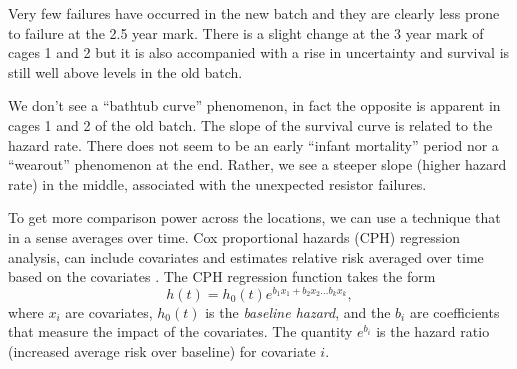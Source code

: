 Very few failures have occurred in the new batch and they are clearly
less prone to failure at the 2.5 year mark. There is a slight change
at the 3 year mark of cages 1 and 2 but it is also accompanied with a
rise in uncertainty and survival is still well above levels in the old
batch.

We don't see a ``bathtub curve'' phenomenon, in fact the opposite is
apparent in cages 1 and 2 of the old batch. The slope of the survival
curve is related to the hazard rate. There does not seem to be an
early ``infant mortality'' period nor a ``wearout'' phenomenon at the
end. Rather, we see a steeper slope (higher hazard rate) in the
middle, associated with the unexpected resistor failures.

To get more comparison power across the locations, we can use a
technique that in a sense averages over time. Cox proportional hazards
(CPH) regression analysis, can include covariates and estimates relative
risk averaged over time based on the covariates
\cite{Cox1972,Harrell2015}. The CPH regression function takes the form
\begin{displaymath}
  h(t) = h_0(t)e^{b_1 x_1 + b_2 x_2 \ldots b_k x_k},
\end{displaymath}
where $x_i$ are covariates, $h_0(t)$ is the {\em baseline hazard}, and
the $b_i$ are coefficients that measure the impact of the
covariates. The quantity $e^{b_i}$ is the hazard ratio (increased
average risk over baseline) for covariate $i$.

